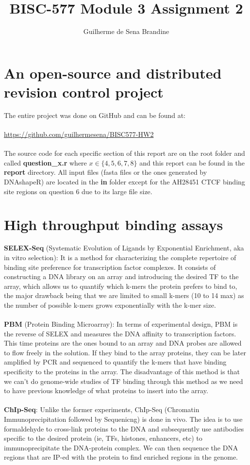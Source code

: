 \documentclass[11pt]{article}
\title{BISC-577 Module 3 Assignment 2}
\author{Guilherme de Sena Brandine}
\begin{document}
\maketitle

\section{An open-source and distributed revision control project}
The entire project was done on GitHub and can be found at:\\
\\
\href{https://github.com/guilhermesena/BISC577-HW2}{https://github.com/guilhermesena/BISC577-HW2} \\
\\
The source code for each specific section of this report are on the root folder and called \textbf{question\_x.r} where $x \in \{ 4,5,6,7,8 \}$ and this report can be found in the \textbf{report} directory. All input files (fasta files or the ones generated by DNAshapeR) are located in the \textbf{in} folder except for the AH28451 CTCF binding site regions on question 6 due to its large file size. 


\section{High throughput binding assays}
\textbf{SELEX-Seq} (Systematic Evolution of Ligands by Exponential Enrichment, aka in vitro selection): It is a method for characterizing the complete repertoire of binding site preference for transcription factor complexes. It consists of constructing a DNA library on an array and introducing the desired TF to the array, which allows us to quantify which k-mers the protein prefers to bind to, the major drawback being that we are limited to small k-mers (10 to 14 max) as the number of possible k-mers grows exponentially with the k-mer size.\\
\\
\textbf{PBM} (Protein Binding Microarray): In terms of experimental design, PBM is the reverse of SELEX and measures the DNA affinity to transcription factors. This time proteins are the ones bound to an array and DNA probes are allowed to flow freely in the solution. If they bind to the array proteins, they can be later amplified by PCR and sequenced to quantify the k-mers that have binding specificity to the proteins in the array. The disadvantage of this method is that we can't do genome-wide studies of TF binding through this method as we need to have previous knowledge of what proteins to insert into the array. \\
\\
\textbf{ChIp-Seq}: Unlike the former experiments, ChIp-Seq (Chromatin Immunoprecipitation followed by Sequenicng) is done in vivo. The idea is to use formaldehyde to cross-link proteins to the DNA and subsequently use antibodies specific to the desired protein (ie, TFs, histones, enhancers, etc) to immunoprecipitate the DNA-protein complex. We can then sequence the DNA regions that are IP-ed with the protein to find enriched regions in the genome. \\
\end{document}
